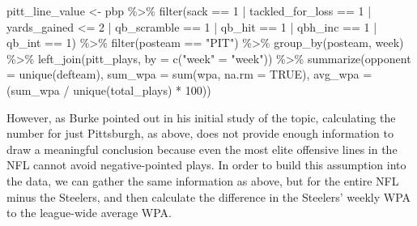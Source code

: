 \documentclass[
  letterpaper,
]{krantz}
\newenvironment{Shaded}{\begin{snugshade}}{\end{snugshade}}
\newcommand{\AttributeTok}[1]{\textcolor[rgb]{0.40,0.45,0.13}{#1}}
\newcommand{\ConstantTok}[1]{\textcolor[rgb]{0.56,0.35,0.01}{#1}}
\newcommand{\DecValTok}[1]{\textcolor[rgb]{0.68,0.00,0.00}{#1}}
\newcommand{\FunctionTok}[1]{\textcolor[rgb]{0.28,0.35,0.67}{#1}}
\newcommand{\NormalTok}[1]{\textcolor[rgb]{0.00,0.23,0.31}{#1}}
\newcommand{\OtherTok}[1]{\textcolor[rgb]{0.00,0.23,0.31}{#1}}
\newcommand{\SpecialCharTok}[1]{\textcolor[rgb]{0.37,0.37,0.37}{#1}}
\newcommand{\StringTok}[1]{\textcolor[rgb]{0.13,0.47,0.30}{#1}}
\begin{document}
\begin{Shaded}
\begin{Highlighting}[]
\NormalTok{pitt\_line\_value }\OtherTok{\textless{}{-}}\NormalTok{ pbp }\SpecialCharTok{\%\textgreater{}\%}
  \FunctionTok{filter}\NormalTok{(sack }\SpecialCharTok{==} \DecValTok{1} \SpecialCharTok{|}
\NormalTok{           tackled\_for\_loss }\SpecialCharTok{==} \DecValTok{1} \SpecialCharTok{|}
\NormalTok{           yards\_gained }\SpecialCharTok{\textless{}=} \DecValTok{2} \SpecialCharTok{|}
\NormalTok{           qb\_scramble }\SpecialCharTok{==} \DecValTok{1} \SpecialCharTok{|}
\NormalTok{           qb\_hit }\SpecialCharTok{==} \DecValTok{1} \SpecialCharTok{|}
\NormalTok{           qbh\_inc }\SpecialCharTok{==} \DecValTok{1} \SpecialCharTok{|}
\NormalTok{           qb\_int }\SpecialCharTok{==} \DecValTok{1}\NormalTok{) }\SpecialCharTok{\%\textgreater{}\%}
  \FunctionTok{filter}\NormalTok{(posteam }\SpecialCharTok{==} \StringTok{"PIT"}\NormalTok{) }\SpecialCharTok{\%\textgreater{}\%}
  \FunctionTok{group\_by}\NormalTok{(posteam, week) }\SpecialCharTok{\%\textgreater{}\%}
  \FunctionTok{left\_join}\NormalTok{(pitt\_plays, }\AttributeTok{by =} \FunctionTok{c}\NormalTok{(}\StringTok{"week"} \OtherTok{=} \StringTok{"week"}\NormalTok{)) }\SpecialCharTok{\%\textgreater{}\%}
  \FunctionTok{summarize}\NormalTok{(}\AttributeTok{opponent =} \FunctionTok{unique}\NormalTok{(defteam),}
            \AttributeTok{sum\_wpa =} \FunctionTok{sum}\NormalTok{(wpa, }\AttributeTok{na.rm =} \ConstantTok{TRUE}\NormalTok{),}
            \AttributeTok{avg\_wpa =}\NormalTok{ (sum\_wpa }\SpecialCharTok{/} \FunctionTok{unique}\NormalTok{(total\_plays) }\SpecialCharTok{*} \DecValTok{100}\NormalTok{))}
\end{Highlighting}
\end{Shaded}

However, as Burke pointed out in his initial study of the topic,
calculating the number for just Pittsburgh, as above, does not provide
enough information to draw a meaningful conclusion because even the most
elite offensive lines in the NFL cannot avoid negative-pointed plays. In
order to build this assumption into the data, we can gather the same
information as above, but for the entire NFL minus the Steelers, and
then calculate the difference in the Steelers' weekly WPA to the
league-wide average WPA.
\end{document}
